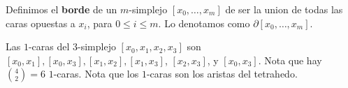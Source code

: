 \begin{definition}
    Definimos el \textbf{borde} de un $m$-simplejo  $[x_0, \dots, x_m]$ de ser
    la union de todas las caras opuestas a $x_i$, para  $0 \leq i \leq m$. Lo
    denotamos como  $\partial{[x_0, \dots, x_m]}$.
\end{definition}

\begin{example}\label{}
    Las $1$-caras del  $3$-simplejo  $[x_0,x_1,x_2,x_3]$ son $[x_0,x_1],
    [x_0,x_3],[x_1,x_2], [x_1,x_3]$, $[x_2,x_3]$, y $[x_0,x_3]$. Nota que hay
    ${4 \choose 2}=6$ $1$-caras. Nota que los $1$-caras son los aristas del
    tetrahedo.
\end{example}
